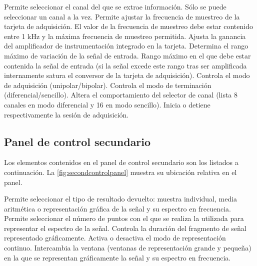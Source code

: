 \begin{enumerate}
     Permite seleccionar el canal del que se
	extrae información. Sólo se puede seleccionar un canal a la vez.
     Permite ajustar la frecuencia de
	muestreo de la tarjeta de adquisición. El valor de la frecuencia de
	muestreo debe estar contenido entre 1 kHz y la máxima frecuencia de
	muestreo permitida.
     Ajusta la ganancia del amplificador de
	instrumentación integrado en la tarjeta. Determina el rango máximo
	de variación de la señal de entrada.
     Rango máximo en el que debe estar contenida
	la señal de entrada (si la señal excede este rango tras ser
	amplificada internamente satura el conversor  de la
	tarjeta de adquisición).
     Controla el modo de adquisición
	(unipolar/bipolar).
     Controla el modo de terminación
	(diferencial/sencillo). Altera el comportamiento del selector de
	canal (lista 8 canales en modo diferencial y 16 en modo sencillo).
     Inicia o detiene respectivamente la sesión
	de adquisición.
\end{enumerate}


\subsection{Panel de control secundario}

Los elementos contenidos en el panel de control secundario son los listados
a continuación. La \cref{fig:secondcontrolpanel} muestra su ubicación
relativa en el panel.

\begin{enumerate}
     Permite seleccionar el tipo de
	resultado devuelto: muestra individual, media aritmética o
	representación gráfica de la señal y su espectro en frecuencia.
     Permite seleccionar el número de puntos con
	el que se realiza la  utilizada para representar el
	espectro de la señal.
     Controla la duración del fragmento de señal
	representado gráficamente. Activa o desactiva el modo de
	representación continuo.
     Intercambia la ventana (ventanas de
	representación grande y pequeña) en la que se representan
	gráficamente la señal y su espectro en frecuencia.
\end{enumerate}

\newlength{\biggestpanel}

